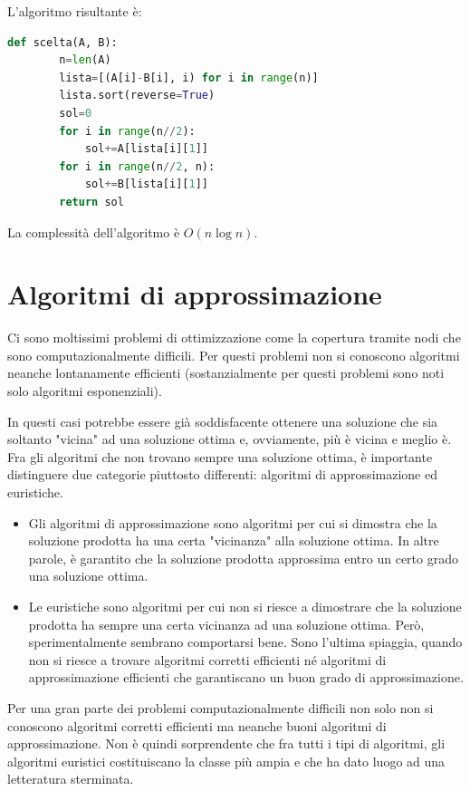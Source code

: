     L'algoritmo risultante è:
    \begin{lstlisting}[language=Python]
    def scelta(A, B):
        n=len(A)
        lista=[(A[i]-B[i], i) for i in range(n)]
        lista.sort(reverse=True)
        sol=0
        for i in range(n//2):
            sol+=A[lista[i][1]]
        for i in range(n//2, n):
            sol+=B[lista[i][1]]
        return sol
    \end{lstlisting}

    La complessità dell'algoritmo è $O(n \log n)$.

\section{Algoritmi di approssimazione}
Ci sono moltissimi problemi di ottimizzazione come la copertura tramite nodi che sono computazionalmente difficili. Per questi problemi non si conoscono algoritmi neanche lontanamente efficienti (sostanzialmente per questi problemi sono noti solo algoritmi esponenziali).

In questi casi potrebbe essere già soddisfacente ottenere una soluzione che sia soltanto "vicina" ad una soluzione ottima e, ovviamente, più è vicina e meglio è. Fra gli algoritmi che non trovano sempre una soluzione ottima, è importante distinguere due categorie piuttosto differenti: algoritmi di approssimazione ed euristiche.
\begin{itemize}
    \item Gli algoritmi di approssimazione sono algoritmi per cui si dimostra che la soluzione prodotta ha una certa "vicinanza" alla soluzione ottima. In altre parole, è garantito che la soluzione prodotta approssima entro un certo grado una soluzione ottima.
    \item Le euristiche sono algoritmi per cui non si riesce a dimostrare che la soluzione prodotta ha sempre una certa vicinanza ad una soluzione ottima. Però, sperimentalmente sembrano comportarsi bene. Sono l'ultima spiaggia, quando non si riesce a trovare algoritmi corretti efficienti né algoritmi di approssimazione efficienti che garantiscano un buon grado di approssimazione.
\end{itemize}
Per una gran parte dei problemi computazionalmente difficili non solo non si conoscono algoritmi corretti efficienti ma neanche buoni algoritmi di approssimazione. Non è quindi sorprendente che fra tutti i tipi di algoritmi, gli algoritmi euristici costituiscano la classe più ampia e che ha dato luogo ad una letteratura sterminata.

